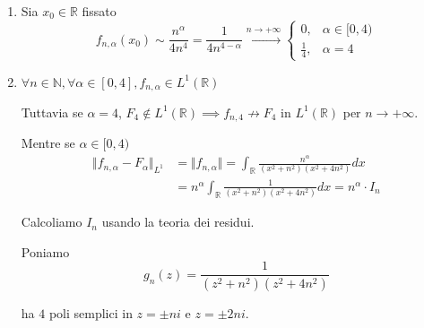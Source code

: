 \Soluzione
\begin{enumerate}
\item Sia $x_{0} \in \mathbb{R}$ fissato\begin{equation*}
f_{n,\alpha }( x_{0}) \sim \frac{n^{\alpha }}{4n^{4}} =\frac{1}{4n^{4-\alpha }}\xrightarrow{n\rightarrow +\infty }\begin{cases}
0, & \alpha \in [ 0,4)\\
\frac{1}{4} , & \alpha =4
\end{cases}
\end{equation*}
\item $\forall n\in \mathbb{N} ,\forall \alpha \in [ 0,4] ,f_{n,\alpha } \in L^{1}(\mathbb{R})$

Tuttavia se $\alpha =4$, $F_{4} \notin L^{1}(\mathbb{R}) \implies f_{n,4} \nrightarrow F_{4}$ in $L^{1}(\mathbb{R})$ per $n\rightarrow +\infty $.

Mentre se $\alpha \in [ 0,4)$\begin{equation*}
\begin{aligned}
\Vert f_{n,\alpha } -F_{\alpha }\Vert _{L^{1}} & =\Vert f_{n,\alpha }\Vert =\int _{\mathbb{R}}\frac{n^{\alpha }}{\left( x^{2} +n^{2}\right)\left( x^{2} +4n^{2}\right)} dx\\
 & =n^{\alpha }\int _{\mathbb{R}}\frac{1}{\left( x^{2} +n^{2}\right)\left( x^{2} +4n^{2}\right)} dx=n^{\alpha } \cdotp I_{n}
\end{aligned}
\end{equation*}

Calcoliamo $I_{n}$ usando la teoria dei residui.

Poniamo\begin{equation*}
g_{n}( z) =\frac{1}{\left( z^{2} +n^{2}\right)\left( z^{2} +4n^{2}\right)}
\end{equation*}

ha $4$ poli semplici in $z=\pm ni$ e $z=\pm 2ni$.

\begin{figure}[htpb]
	\centering
{} %

\begin{tikzpicture}[x=0.75pt,y=0.75pt,yscale=-1,xscale=1]


\end{tikzpicture}
\end{figure}
\end{enumerate}
